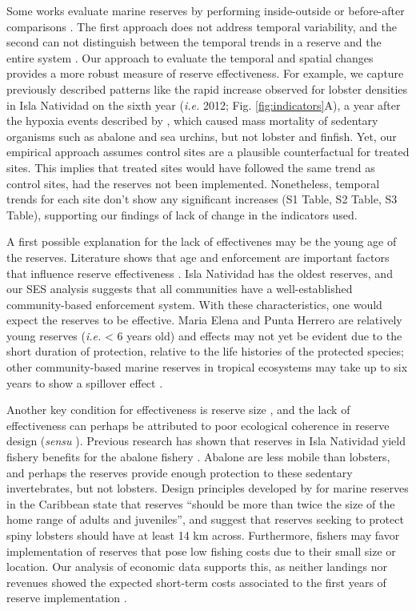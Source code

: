 \documentclass{frontiersSCNS}
\theoremstyle{definition}
\theoremstyle{definition}
\theoremstyle{definition}
\theoremstyle{remark}
\begin{document}
Some works evaluate marine reserves by performing inside-outside
\citep{guidetti_2014-8Z,friedlander_2017-oI,rodriguez_2017-PD} or
before-after comparisons \citep{betti_2017-lq}. The first approach does
not address temporal variability, and the second can not distinguish
between the temporal trends in a reserve and the entire system
\citep{depalma_2018}. Our approach to evaluate the temporal and spatial
changes provides a more robust measure of reserve effectiveness. For
example, we capture previously described patterns like the rapid
increase observed for lobster densities in Isla Natividad on the sixth
year (\emph{i.e.} 2012; Fig. \ref{fig:indicators}A), a year after the
hypoxia events described by \citet{micheli_2012-EU}, which caused mass
mortality of sedentary organisms such as abalone and sea urchins, but
not lobster and finfish. Yet, our empirical approach assumes control
sites are a plausible counterfactual for treated sites. This implies
that treated sites would have followed the same trend as control sites,
had the reserves not been implemented. Nonetheless, temporal trends for
each site don't show any significant increases (S1 Table, S2 Table, S3
Table), supporting our findings of lack of change in the indicators
used.

A first possible explanation for the lack of effectivenes may be the
young age of the reserves. Literature shows that age and enforcement are
important factors that influence reserve effectiveness
\citep{edgar_2014-UO,babcock_2010}. Isla Natividad has the oldest
reserves, and our SES analysis suggests that all communities have a
well-established community-based enforcement system. With these
characteristics, one would expect the reserves to be effective. Maria
Elena and Punta Herrero are relatively young reserves (\emph{i.e.}
\textless{} 6 years old) and effects may not yet be evident due to the
short duration of protection, relative to the life histories of the
protected species; other community-based marine reserves in tropical
ecosystems may take up to six years to show a spillover effect
\citep{dasilva_2015-zX}.

Another key condition for effectiveness is reserve size
\citep{edgar_2014-UO}, and the lack of effectiveness can perhaps be
attributed to poor ecological coherence in reserve design (\emph{sensu}
\citet{rees_2018}). Previous research has shown that reserves in Isla
Natividad yield fishery benefits for the abalone fishery
\citep{rossetto_2015-V0}. Abalone are less mobile than lobsters, and
perhaps the reserves provide enough protection to these sedentary
invertebrates, but not lobsters. Design principles developed by
\citet{green_2017} for marine reserves in the Caribbean state that
reserves ``should be more than twice the size of the home range of
adults and juveniles'', and suggest that reserves seeking to protect
spiny lobsters should have at least 14 km across. Furthermore, fishers
may favor implementation of reserves that pose low fishing costs due to
their small size or location. Our analysis of economic data supports
this, as neither landings nor revenues showed the expected short-term
costs associated to the first years of reserve implementation
\citep{ovando_2016-Wg}.
\end{document}
